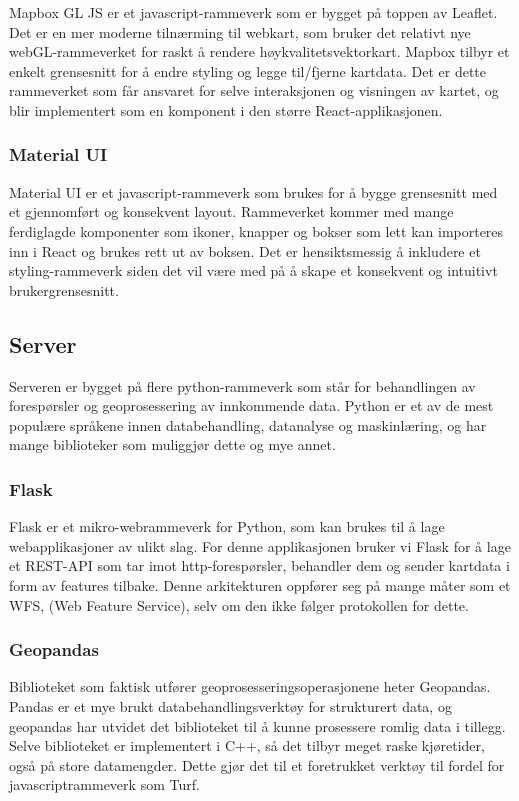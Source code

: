 Mapbox GL JS er et javascript-rammeverk som er bygget på toppen av Leaflet\cite{Leaflet}. Det er en mer moderne tilnærming til webkart, som bruker det relativt nye webGL-rammeverket for raskt å rendere høykvalitetsvektorkart. Mapbox tilbyr et enkelt grensesnitt for å endre styling og legge til/fjerne kartdata. Det er dette rammeverket som får ansvaret for selve interaksjonen og visningen av kartet, og blir implementert som en komponent i den større React-applikasjonen. 

\subsubsection{Material UI}

Material UI er et javascript-rammeverk som brukes for å bygge grensesnitt med et gjennomført og konsekvent layout. Rammeverket kommer med mange ferdiglagde komponenter som ikoner, knapper og bokser som lett kan importeres inn i React og brukes rett ut av boksen. Det er hensiktsmessig å inkludere et styling-rammeverk siden det vil være med på å skape et konsekvent og intuitivt brukergrensesnitt.  

\subsection{Server}

Serveren er bygget på flere python-rammeverk som står for behandlingen av forespørsler og geoprosessering av innkommende data. Python er et av de mest populære språkene innen databehandling, datanalyse og maskinlæring, og har mange biblioteker som muliggjør dette og mye annet.  

\subsubsection{Flask}

Flask er et mikro-webrammeverk for Python, som kan brukes til å lage webapplikasjoner av ulikt slag. For denne applikasjonen bruker vi Flask for å lage et REST-API som tar imot http-forespørsler, behandler dem og sender kartdata i form av features tilbake. Denne arkitekturen oppfører seg på mange måter som et WFS, (Web Feature Service)\cite{OGC}, selv om den ikke følger protokollen for dette. 

\subsubsection{Geopandas}

Biblioteket som faktisk utfører geoprosesseringsoperasjonene heter Geopandas. Pandas er et mye brukt databehandlingsverktøy for strukturert data, og geopandas har utvidet det biblioteket til å kunne prosessere romlig data i tillegg. Selve biblioteket er implementert i C++, så det tilbyr meget raske kjøretider, også på store datamengder. Dette gjør det til et foretrukket verktøy til fordel for javascriptrammeverk som Turf.  